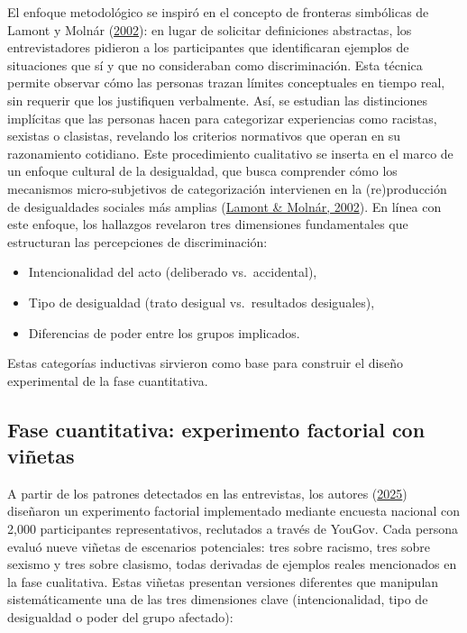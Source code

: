 \documentclass[
  13pt,
  a4paper,
]{article}
\providecommand{\tightlist}{%
  \setlength{\itemsep}{0pt}\setlength{\parskip}{0pt}}
\begin{document}
El enfoque metodológico se inspiró en el concepto de fronteras simbólicas de Lamont y Molnár (\protect\hyperlink{ref-lamont_study_2002}{2002}): en lugar de solicitar definiciones abstractas, los entrevistadores pidieron a los participantes que identificaran ejemplos de situaciones que sí y que no consideraban como discriminación. Esta técnica permite observar cómo las personas trazan límites conceptuales en tiempo real, sin requerir que los justifiquen verbalmente. Así, se estudian las distinciones implícitas que las personas hacen para categorizar experiencias como racistas, sexistas o clasistas, revelando los criterios normativos que operan en su razonamiento cotidiano. Este procedimiento cualitativo se inserta en el marco de un enfoque cultural de la desigualdad, que busca comprender cómo los mecanismos micro-subjetivos de categorización intervienen en la (re)producción de desigualdades sociales más amplias (\protect\hyperlink{ref-lamont_study_2002}{Lamont \& Molnár, 2002}). En línea con este enfoque, los hallazgos revelaron tres dimensiones fundamentales que estructuran las percepciones de discriminación:

\begin{itemize}
\tightlist
\item
  Intencionalidad del acto (deliberado vs.~accidental),
\item
  Tipo de desigualdad (trato desigual vs.~resultados desiguales),
\item
  Diferencias de poder entre los grupos implicados.
\end{itemize}

Estas categorías inductivas sirvieron como base para construir el diseño experimental de la fase cuantitativa.

\hypertarget{fase-cuantitativa-experimento-factorial-con-viuxf1etas}{%
\subsection{Fase cuantitativa: experimento factorial con viñetas}\label{fase-cuantitativa-experimento-factorial-con-viuxf1etas}}

A partir de los patrones detectados en las entrevistas, los autores (\protect\hyperlink{ref-valentino_cultural_2025}{2025}) diseñaron un experimento factorial implementado mediante encuesta nacional con 2,000 participantes representativos, reclutados a través de YouGov. Cada persona evaluó nueve viñetas de escenarios potenciales: tres sobre racismo, tres sobre sexismo y tres sobre clasismo, todas derivadas de ejemplos reales mencionados en la fase cualitativa. Estas viñetas presentan versiones diferentes que manipulan sistemáticamente una de las tres dimensiones clave (intencionalidad, tipo de desigualdad o poder del grupo afectado):
\end{document}

